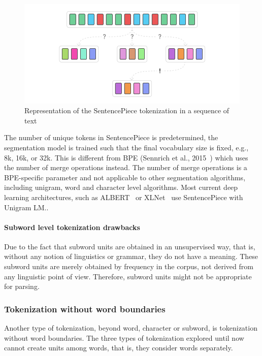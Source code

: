 \begin{figure}[!ht]
    \centering
    \includegraphics[width=14cm]{figures/sentencepiece.png}
    \caption{Representation of the SentencePiece tokenization in a sequence of text}
\end{figure}

The number of unique tokens in SentencePiece is predetermined, the segmentation model is trained such that the final vocabulary size is fixed, e.g., 8k, 16k, or 32k. This is different from BPE (Sennrich et al., 2015~\cite{sennrich2015neural}) which uses the number of merge operations instead. The number of merge operations is a BPE-specific parameter and not applicable to other segmentation algorithms, including unigram, word and character level algorithms. Most current deep learning architectures, such as ALBERT~\cite{lan2019albert} or XLNet~\cite{yang2019xlnet} use SentencePiece with Unigram LM..

\paragraph{Subword level tokenization drawbacks}

Due to the fact that subword units are obtained in an unsupervised way, that is, without any notion of linguistics or grammar, they do not have a meaning. These subword units are merely obtained by frequency in the corpus, not derived from any linguistic point of view. Therefore, subword units might not be appropriate for parsing.

\subsubsection{Tokenization without word boundaries}\label{subsec:wordtokwowb}

Another type of tokenization, beyond word, character or subword, is tokenization without word boundaries. The three types of tokenization explored until now cannot create units among words, that is, they consider words separately.

